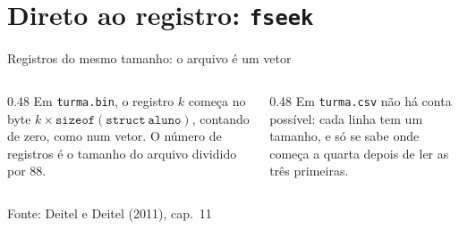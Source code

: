 \documentclass[aspectratio=169]{beamer}
\newcommand{\fonte}[1]{\vfill\hfill{\scriptsize\textcolor{UFSGray}{Fonte: #1}}}
\begin{document}
\section{Direto ao registro: \texttt{fseek}}

\begin{frame}{Registros do mesmo tamanho: o arquivo é um vetor}
  \begin{center}
  \end{center}
  \vspace{-0.3em}
  \begin{columns}[T]
    \begin{column}{0.48\textwidth}
      \small Em \texttt{turma.bin}, o registro $k$ começa no byte
      $k \times \mathtt{sizeof(struct\ aluno)}$, contando de zero, como num
      vetor. O número de registros é o tamanho do arquivo dividido por 88.
    \end{column}
    \begin{column}{0.48\textwidth}
      \small Em \texttt{turma.csv} não há conta possível: cada linha tem um
      tamanho, e só se sabe onde começa a quarta depois de ler as três
      primeiras.
    \end{column}
  \end{columns}
  \fonte{Deitel e Deitel (2011), cap.~11~\cite{deitel2011como}}
\end{frame}
\end{document}
